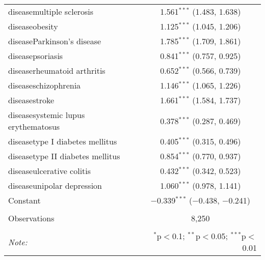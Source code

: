 \begin{table}[!htbp]
\begin{tabular}{@{\extracolsep{5pt}}lc}
  diseasemultiple sclerosis & 1.561$^{***}$ (1.483, 1.638) \\ 
  diseaseobesity & 1.125$^{***}$ (1.045, 1.206) \\ 
  diseaseParkinson's disease & 1.785$^{***}$ (1.709, 1.861) \\ 
  diseasepsoriasis & 0.841$^{***}$ (0.757, 0.925) \\ 
  diseaserheumatoid arthritis & 0.652$^{***}$ (0.566, 0.739) \\ 
  diseaseschizophrenia & 1.146$^{***}$ (1.065, 1.226) \\ 
  diseasestroke & 1.661$^{***}$ (1.584, 1.737) \\ 
  diseasesystemic lupus erythematosus & 0.378$^{***}$ (0.287, 0.469) \\ 
  diseasetype I diabetes mellitus & 0.405$^{***}$ (0.315, 0.496) \\ 
  diseasetype II diabetes mellitus & 0.854$^{***}$ (0.770, 0.937) \\ 
  diseaseulcerative colitis & 0.432$^{***}$ (0.342, 0.523) \\ 
  diseaseunipolar depression & 1.060$^{***}$ (0.978, 1.141) \\ 
  Constant & $-$0.339$^{***}$ ($-$0.438, $-$0.241) \\ 
 \hline \\[-1.8ex] 
Observations & 8,250 \\ 
\hline 
\hline \\[-1.8ex] 
\textit{Note:}  & \multicolumn{1}{r}{$^{*}$p$<$0.1; $^{**}$p$<$0.05; $^{***}$p$<$0.01} \\ 
\end{tabular} 
\end{table} 
